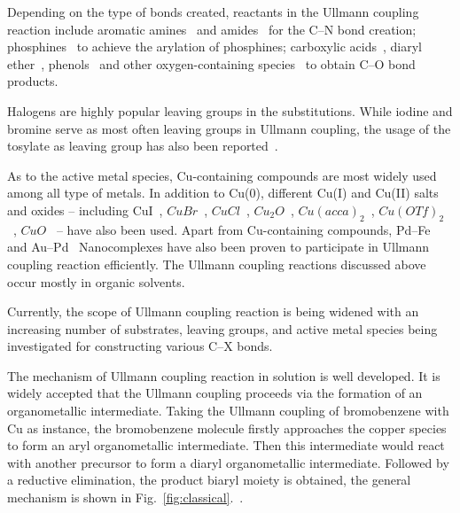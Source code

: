 \documentclass[%
 reprint,
 amsmath,amssymb,
 aps,
prb,
]{revtex4-2}
\begin{document}
Depending on the type of bonds created, reactants in the Ullmann coupling reaction include aromatic amines~\cite{ullmann_17,ullmann_18} and amides~\cite{ullmann_19,ullmann_20} for the C--N bond creation; phosphines~\cite{ullmann_21,ullmann_22} to achieve the arylation of phosphines; carboxylic acids~\cite{ullmann_23}, diaryl ether~\cite{ullmann_24}, phenols~\cite{ullmann_25} and other oxygen-containing species~\cite{ullmann_26,ullmann_27,ullmann_28} to obtain C--O bond products.

Halogens are highly popular leaving groups in the substitutions. While iodine and bromine serve as most often leaving groups in Ullmann coupling, the usage of the tosylate as leaving group has also been reported~\cite{ullmann_15}. 

As to the active metal species, Cu-containing compounds are most widely used among all type of metals. In addition to Cu(0), different Cu(I) and Cu(II) salts and oxides -- including CuI~\cite{ullmann_07,ullmann_08,ullmann_09}, $CuBr$~\cite{ullmann_10,ullmann_11}, $CuCl$~\cite{ullmann_13}, $Cu_2O$~\cite{ullmann_12}, $Cu(acca)_2$~\cite{ullmann_14}, $Cu(OTf)_2$~\cite{ullmann_15}, $CuO$~\cite{ullmann_16} -- have also been used. Apart from Cu-containing compounds, Pd–Fe~\cite{ullmann_35} and Au–Pd~\cite{ullmann_36} Nanocomplexes have also been proven to participate in Ullmann coupling reaction efficiently. The Ullmann coupling reactions discussed above occur mostly in organic solvents. 

Currently, the scope of Ullmann coupling reaction is being widened with an increasing number of substrates, leaving groups, and active metal species being investigated for constructing various C--X bonds. 


The mechanism of Ullmann coupling reaction in solution is well developed. It is widely accepted that the Ullmann coupling proceeds via the formation of an organometallic intermediate. Taking the Ullmann coupling of bromobenzene with Cu as instance, the bromobenzene molecule firstly approaches the copper species to form an aryl organometallic intermediate. Then this intermediate would react with another precursor to form a diaryl organometallic intermediate. Followed by a reductive elimination, the product biaryl moiety is obtained, the general mechanism is shown in Fig.~\ref{fig:classical}.~\cite{ullmann_37}.
\end{document}
